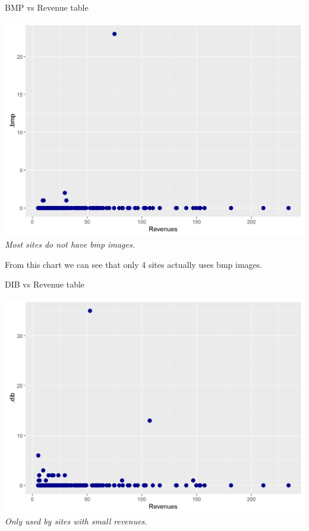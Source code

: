 \documentclass{article}
\begin{document}
\begin{table}[H]
\centering
\caption{BMP vs Revenue table}
\begin{center}
\includegraphics[scale=0.5]{../R/photos/54_bmp_rev.png}    \\
\textit{Most sites do not have bmp images.}
\end{center}
\end{table}
From this chart we can see that only 4 sites actually uses bmp images.
\begin{table}[H]
\centering
\caption{DIB vs Revenue table}
\begin{center}
\includegraphics[scale=0.5]{../R/photos/55_dib_rev.png}    \\
\textit{Only used by sites with small revenues.}
\end{center}
\end{table}
\end{document}
